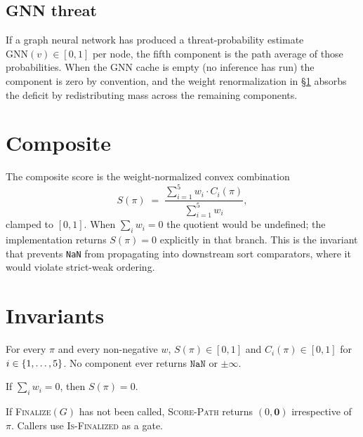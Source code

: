 \documentclass[11pt,openany]{book}
\begin{document}
\subsection{GNN threat}
\label{sec:scoring:gnn}

If a graph neural network has produced a threat-probability estimate
$\mathrm{GNN}(v) \in [0, 1]$ per node, the fifth component is the
path average of those probabilities. When the GNN cache is empty
(no inference has run) the component is zero by convention, and the
weight renormalization in \S\ref{sec:scoring:composite} absorbs the
deficit by redistributing mass across the remaining components.

\section{Composite}
\label{sec:scoring:composite}

The composite score is the weight-normalized convex combination
\begin{equation}
\label{eq:composite}
S(\pi) \;=\; \frac{\sum_{i=1}^{5} w_i \cdot C_i(\pi)}{\sum_{i=1}^{5} w_i},
\end{equation}
clamped to $[0, 1]$. When $\sum_i w_i = 0$ the quotient would be
undefined; the implementation returns $S(\pi) = 0$ explicitly in
that branch. This is the invariant that prevents \texttt{NaN} from
propagating into downstream sort comparators, where it would
violate strict-weak ordering.

\section{Invariants}
\label{sec:scoring:invariants}

\begin{invariant}[Boundedness]
\label{inv:scoring:bound}
For every $\pi$ and every non-negative $w$, $S(\pi) \in [0, 1]$ and
$C_i(\pi) \in [0, 1]$ for $i \in \{1, \dots, 5\}$. No component
ever returns $\mathtt{NaN}$ or $\pm\infty$.
\end{invariant}

\begin{invariant}
\label{inv:scoring:zero}
If $\sum_i w_i = 0$, then $S(\pi) = 0$.
\end{invariant}

\begin{invariant}
\label{inv:scoring:unfin}
If \textsc{Finalize}$(G)$ has not been called, \textsc{Score-Path}
returns $(0, \mathbf{0})$ irrespective of $\pi$. Callers use
\textsc{Is-Finalized} as a gate.
\end{invariant}
\end{document}
